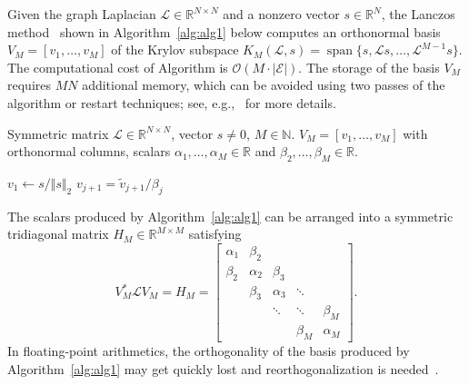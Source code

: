 \documentclass{article}
\newcommand{\E}{\mathcal{E}}
\newcommand{\Lap}{\mathcal{L}}
\newcommand{\Om}{\mathcal{O}}
\begin{document}
Given the graph Laplacian $\Lap\in\mathbb{R}^{N\times N}$ and a nonzero vector $s\in\mathbb{R}^N$, the Lanczos method~\cite{golub2013matrix} shown in Algorithm~\ref{alg:alg1} below computes an orthonormal basis $V_M = [v_1,\ldots,v_M]$ of the Krylov subspace $K_M(\Lap,s)  = \operatorname{span}\{s, \Lap s,\ldots,\Lap^{M-1} s \}$. 
The computational cost of Algorithm is $\Om(M\cdot |\E|)$.
The storage of the basis $V_M$ requires $M N$ additional memory, which can be avoided using two passes of the algorithm or
restart techniques; see, e.g.,~\cite{Frommer2014} for more details.
   \begin{algorithm}
    \caption{}
    \label{alg:alg1}
    \renewcommand{\algorithmicrequire}{\textbf{Input:}}
    \renewcommand{\algorithmicensure}{\textbf{Output:}}

    \begin{algorithmic}[1]
   
    \REQUIRE Symmetric matrix $\Lap \in \mathbb{R}^{N\times N}$, vector $s\neq 0$, $M\in \mathbb{N}$.
    \ENSURE $V_M = [v_1,\ldots,v_M]$ with orthonormal columns, scalars $\alpha_1,\ldots,\alpha_M \in \mathbb R$ and $\beta_2,\ldots,\beta_M \in \mathbb R$.
 
   \STATE $v_1 \gets s/ \Vert s\Vert_2$
        \STATE {$w = \Lap v_j$}
          \ENDIF
       \STATE $v_{j+1} = \tilde{v}_{j+1}/\beta_{j}$     
   \ENDFOR     
   \end{algorithmic}
   \end{algorithm}

The scalars produced by Algorithm~\ref{alg:alg1} can be arranged into 
a symmetric tridiagonal matrix $H_M \in \mathbb R^{M\times M}$ satisfying 
\begin{equation*}
\label{eqref:projection}
V_M^{*} \Lap V_M = H_M = \begin{bmatrix}
\alpha_1 &\beta_2\\
\beta_2 &\alpha_2 &\beta_3\\
 &\beta_3 &\alpha_3 &\ddots &\\
& &\ddots & \ddots & \beta_{M} \\
& & &\beta_{M} &\alpha_{M} 
\end{bmatrix}\text{.}
\end{equation*}
In floating-point arithmetics, the orthogonality of the basis produced by Algorithm~\ref{alg:alg1} may get quickly lost and reorthogonalization is needed~\cite{cullum2002lanczos}.
\end{document}
